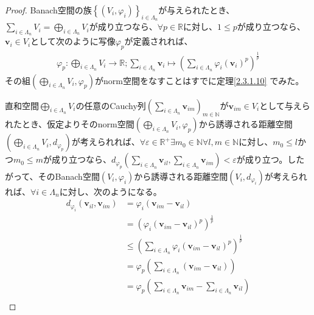 \documentclass[dvipdfmx]{jsarticle}
\begin{document}
\begin{proof}
Banach空間の族$\left\{ \left( V_{i},\varphi_{i} \right) \right\}_{i \in \varLambda_{n}}$が与えられたとき、$\sum_{i \in \varLambda_{n}} V_{i} = \bigoplus_{i \in \varLambda_{n}} V_{i}$が成り立つなら、$\forall p \in \mathbb{R}$に対し、$1 \leq p$が成り立つなら、$\mathbf{v}_{i} \in V_{i}$として次のように写像$\varphi_{p}$が定義されれば、
\begin{align*}
\varphi_{p}:\bigoplus_{i \in \varLambda_{n}} V_{i} \rightarrow \mathbb{R};\sum_{i \in \varLambda_{n}} \mathbf{v}_{i} \mapsto \left( \sum_{i \in \varLambda_{n}} {\varphi_{i}\left( \mathbf{v}_{i} \right)}^{p} \right)^{\frac{1}{p}}
\end{align*}
その組$\left( \bigoplus_{i \in \varLambda_{n}} V_{i},\varphi_{p} \right)$がnorm空間をなすことはすでに定理\ref{2.3.1.10}
でみた。\par
直和空間$\bigoplus_{i \in \varLambda_{n}} V_{i}$の任意のCauchy列$\left( \sum_{i \in \varLambda_{n}} \mathbf{v}_{im} \right)_{m \in \mathbb{N}}$が$\mathbf{v}_{im} \in V_{i}$として与えられたとき、仮定よりそのnorm空間$\left( \bigoplus_{i \in \varLambda_{n}} V_{i},\varphi_{p} \right)$から誘導される距離空間$\left( \bigoplus_{i \in \varLambda_{n}} V_{i},d_{\varphi_{p}} \right)$が考えられれば、$\forall\varepsilon \in \mathbb{R}^{+}\exists m_{0} \in \mathbb{N}\forall l,m \in \mathbb{N}$に対し、$m_{0} \leq l$かつ$m_{0} \leq m$が成り立つなら、$d_{\varphi_{p}}\left( \sum_{i \in \varLambda_{n}} \mathbf{v}_{il},\sum_{i \in \varLambda_{n}} \mathbf{v}_{im} \right) < \varepsilon$が成り立つ。したがって、そのBanach空間$\left( V_{i},\varphi_{i} \right)$から誘導される距離空間$\left( V_{i},d_{\varphi_{i}} \right)$が考えられれば、$\forall i \in \varLambda_{n}$に対し、次のようになる。
\begin{align*}
d_{\varphi_{i}}\left( \mathbf{v}_{il},\mathbf{v}_{im} \right) &= \varphi_{i}\left( \mathbf{v}_{im} - \mathbf{v}_{il} \right)\\
&= \left( {\varphi_{i}\left( \mathbf{v}_{im} - \mathbf{v}_{il} \right)}^{p} \right)^{\frac{1}{p}}\\
&\leq \left( \sum_{i \in \varLambda_{n}} {\varphi_{i}\left( \mathbf{v}_{im} - \mathbf{v}_{il} \right)}^{p} \right)^{\frac{1}{p}}\\
&= \varphi_{p}\left( \sum_{i \in \varLambda_{n}} \left( \mathbf{v}_{im} - \mathbf{v}_{il} \right) \right)\\
&= \varphi_{p}\left( \sum_{i \in \varLambda_{n}} \mathbf{v}_{im} - \sum_{i \in \varLambda_{n}} \mathbf{v}_{il} \right)\\

\end{align*}
\end{proof}
\end{document}
